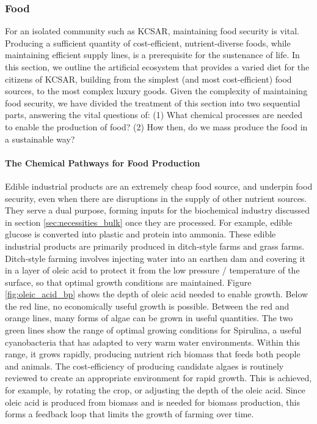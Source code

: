 \documentclass[fleqn,10pt]{Stylesheet} %
\begin{document}
\subsubsection{Food}
\label{sec:necessities_food}
 
For an isolated community such as KCSAR, maintaining food security is vital. Producing a sufficient quantity of cost-efficient, nutrient-diverse foods, while maintaining efficient supply lines, is a prerequisite for the sustenance of life. In this section, we outline the artificial ecosystem that provides a varied diet for the citizens of KCSAR, building from the simplest (and most cost-efficient) food sources, to the most complex luxury goods. Given the complexity of maintaining food security, we have divided the treatment of this section into two sequential parts, answering the vital questions of: (1) What chemical processes are needed to enable the production of food? (2) How then, do we mass produce the food in a sustainable way?

\paragraph{The Chemical Pathways for Food Production}
Edible industrial products are an extremely cheap food source, and underpin food security, even when there are disruptions in the supply of other nutrient sources. They serve a dual purpose, forming inputs for the biochemical industry discussed in section \ref{sec:necessities_bulk} once they are processed. For example, edible glucose is converted into plastic and protein into ammonia. These edible industrial products are primarily produced in ditch-style farms and grass farms. Ditch-style farming involves injecting water into an earthen dam and covering it in a layer of oleic acid to protect it from the low pressure / temperature of the surface, so that optimal growth conditions are maintained. Figure \ref{fig:oleic_acid_bp} shows the depth of oleic acid needed to enable growth. Below the red line, no economically useful growth is possible. Between the red and orange lines, many forms of algae can be grown in useful quantities. The two green lines show the range of optimal growing conditions for Spirulina, a useful cyanobacteria that has adapted to very warm water environments. Within this range, it grows rapidly, producing nutrient rich biomass that feeds both people and animals. The cost-efficiency of producing candidate algaes is routinely reviewed to create an appropriate environment for rapid growth. This is achieved, for example, by rotating the crop, or adjusting the depth of the oleic acid. Since oleic acid is produced from biomass and is needed for biomass production, this forms a feedback loop that limits the growth of farming over time.
\end{document}
